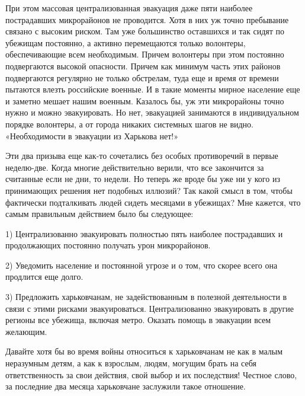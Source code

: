 При этом массовая централизованная эвакуация даже пяти наиболее пострадавших
микрорайонов не проводится. Хотя в них уж точно пребывание связано с высоким
риском. Там уже большинство оставшихся и так сидят по убежищам постоянно, а
активно перемещаются только волонтеры, обеспечивающие всем необходимым. Причем
волонтеры при этом постоянно подвергаются высокой опасности. Причем как минимум
часть этих районов подвергаются регулярно не только обстрелам, туда еще и время
от времени пытаются влезть российские военные. И в такие моменты мирное
население еще и заметно мешает нашим военным. Казалось бы, уж эти микрорайоны
точно нужно и можно эвакуировать. Но нет, эвакуацией занимаются в
индивидуальном порядке волонтеры, а от города никаких системных шагов не видно.
«Необходимости в эвакуации из Харькова нет!»

Эти два призыва еще как-то сочетались без особых противоречий в первые
неделю-две. Когда многие действительно верили, что все закончится за считанные
если не дни, то недели. Но теперь же вроде бы уже ни у кого из принимающих
решения нет подобных иллюзий? Так какой смысл в том, чтобы фактически
подталкивать людей сидеть месяцами в убежищах? Мне кажется, что самым
правильным действием было бы следующее:

1) Централизованно эвакуировать полностью пять наиболее пострадавших и
продолжающих постоянно получать урон микрорайонов. 

2) Уведомить население и постоянной угрозе и о том, что скорее всего она
продлится еще долго. 

3) Предложить харьковчанам, не задействованным в полезной деятельности в связи
с этими рисками эвакуироваться. Централизованно эвакуировать в другие регионы
все убежища, включая метро. Оказать помощь в эвакуации всем желающим. 

Давайте хотя бы во время войны относиться к харьковчанам не как в малым
неразумным детям, а как к взрослым, людям, могущим брать на себя
ответственность за свои действия, свой выбор и их последствия! Честное слово,
за последние два месяца харьковчане заслужили такое отношение.

